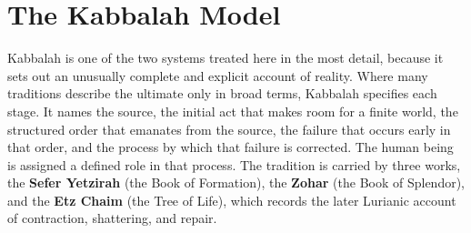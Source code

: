 \chapter{The Kabbalah Model}

Kabbalah is one of the two systems treated here in the most detail, because it
sets out an unusually complete and explicit account of reality. Where many
traditions describe the ultimate only in broad terms, Kabbalah specifies each
stage. It names the source, the initial act that makes room for a finite world,
the structured order that emanates from the source, the failure that occurs early
in that order, and the process by which that failure is corrected. The human being
is assigned a defined role in that process. The tradition is carried by three
works, the \textbf{Sefer Yetzirah} (the Book of Formation), the \textbf{Zohar}
(the Book of Splendor), and the \textbf{Etz Chaim} (the Tree of Life), which
records the later Lurianic account of contraction, shattering, and repair.
